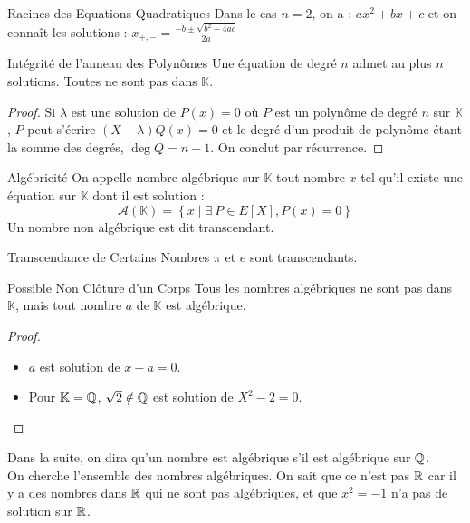\documentclass{cours}
\renewcommand*{\K}{\mathbb{K}}
\begin{document}
    \begin{propositionfr}{Racines des Equations Quadratiques}{}
        Dans le cas $n = 2$, on a : $ax^{2} + bx + c$ et on connaît les solutions : $x_{+, -} = \frac{-b \pm \sqrt{b^{2} - 4ac}}{2a}$
    \end{propositionfr}

    \begin{théorème}{Intégrité de l'anneau des Polynômes}{}
        Une équation de degré $n$ admet au plus $n$ solutions. Toutes ne sont pas dans $\K$.
    \end{théorème}
    \begin{proof}
        Si $\lambda$ est une solution de $P(x) = 0$ où $P$ est un polynôme de degré $n$ sur $\K$, $P$ peut s'écrire $(X - \lambda)Q(x) = 0$ et le degré d'un produit de polynôme étant la somme des degrés, $\deg Q = n - 1$. On conclut par récurrence.
    \end{proof}

    \begin{définition}{Algébricité}{}
        On appelle nombre algébrique sur $\K$ tout nombre $x$ tel qu'il existe une équation sur $\K$ dont il est solution : 
        \[
            \mathcal{A}(\K) = \left\{x \mid \exists \ P \in E[X], P(x) = 0\right\}    
        \]
        Un nombre non algébrique est dit transcendant.
    \end{définition}
    \begin{propositionfr}{Transcendance de Certains Nombres}{}
        $\pi$ et $e$ sont transcendants.
    \end{propositionfr}

    \begin{propositionfr}{Possible Non Clôture d'un Corps}{}
        Tous les nombres algébriques ne sont pas dans $\K$, mais tout nombre $a$ de $\K$ est algébrique.
    \end{propositionfr}
    \begin{proof}
        \begin{itemize}
            \item $a$ est solution de $x - a = 0$. 
            \item Pour $\K = \Q$, $\sqrt{2} \notin \mathbb{Q}$ est solution de $X^{2} - 2 = 0$. 
        \end{itemize}
    \end{proof}
    
    Dans la suite, on dira qu'un nombre est algébrique s'il est algébrique sur $\mathbb{Q}$.\\
    On cherche l'ensemble des nombres algébriques. On sait que ce n'est pas $\mathbb{R}$ car il y a des nombres dans $\mathbb{R}$ qui ne sont pas algébriques, et que $x^{2} = -1$ n'a pas de solution sur $\mathbb{R}$.
\end{document}
